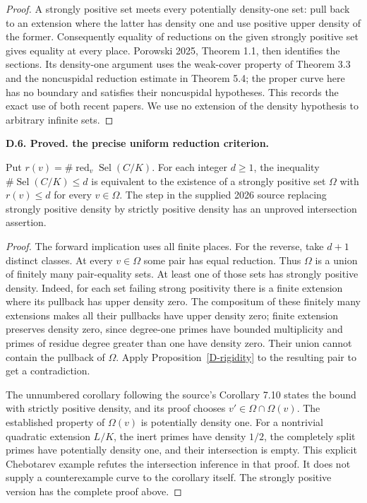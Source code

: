 \documentclass[11pt,oneside]{article}
\makeatletter
\newcounter{statementanchor}
\newenvironment{statement}[3]{%
 \refstepcounter{statementanchor}\def\@currentlabel{#1}%
 \par\addvspace{9pt}\noindent
 \textbf{#1. #2. #3.}\par\nobreak\noindent\ignorespaces
}{\par\addvspace{5pt}}
\makeatother
\begin{document}
\begin{proof}
A strongly positive set meets every potentially
density-one set: pull back to an extension
where the latter has density one and use
positive upper density of the former.
Consequently equality of reductions on the
given strongly positive set gives equality
at every place. Porowski 2025, Theorem 1.1,
then identifies the sections. Its density-one
argument uses the weak-cover property of
Theorem 3.3 and the noncuspidal reduction
estimate in Theorem 5.4; the proper curve
here has no boundary and satisfies their
noncuspidal hypotheses. This records the
exact use of both recent papers. We use no
extension of the density hypothesis to
arbitrary infinite sets.
\end{proof}

\begin{statement}{D.6}{Proved}{the precise uniform reduction criterion}
\label{st:D.6}
\label{D-uniform}
Put $r(v)=\#\operatorname{red}_v\operatorname{Sel}(C/K)$.
For each integer $d\geq1$, the inequality
$\#\operatorname{Sel}(C/K)\leq d$ is equivalent
to the existence of a strongly positive set
$\Omega$ with $r(v)\leq d$ for every $v\in\Omega$.
The step in the supplied 2026 source replacing
strongly positive density by strictly positive
density has an unproved intersection assertion.
\end{statement}
\begin{proof}
The forward implication uses all finite places.
For the reverse, take $d+1$ distinct classes.
At every $v\in\Omega$ some pair has equal
reduction. Thus $\Omega$ is a union of
finitely many pair-equality sets. At least
one of those sets has strongly positive
density. Indeed, for each set failing
strong positivity there is a finite extension
where its pullback has upper density zero.
The compositum of these finitely many
extensions makes all their pullbacks have
upper density zero; finite extension preserves
density zero, since degree-one primes have
bounded multiplicity and primes of residue
degree greater than one have density zero.
Their union cannot contain the pullback
of $\Omega$. Apply Proposition~\ref{D-rigidity}
to the resulting pair to get a contradiction.

The unnumbered corollary following the source's
Corollary 7.10 states the bound with strictly
positive density, and its proof chooses
$v'\in\Omega\cap\Omega(v)$. The established
property of $\Omega(v)$ is potentially density
one. For a nontrivial quadratic extension
$L/K$, the inert primes have density $1/2$,
the completely split primes have potentially
density one, and their intersection is empty.
This explicit Chebotarev example refutes the
intersection inference in that proof.
It does not supply a counterexample curve
to the corollary itself. The strongly positive
version has the complete proof above.
\end{proof}
\end{document}
